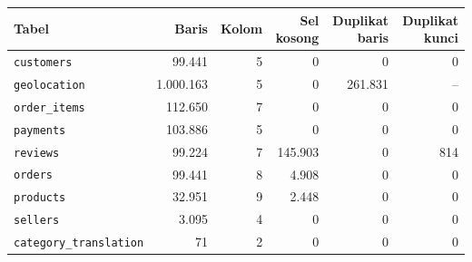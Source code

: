 \begin{tabular}{lrrrrr}
\toprule
Tabel & Baris & Kolom & Sel kosong & Duplikat baris & Duplikat kunci \\
\midrule
\texttt{customers} & 99.441 & 5 & 0 & 0 & 0 \\
\texttt{geolocation} & 1.000.163 & 5 & 0 & 261.831 & -- \\
\texttt{order\_items} & 112.650 & 7 & 0 & 0 & 0 \\
\texttt{payments} & 103.886 & 5 & 0 & 0 & 0 \\
\texttt{reviews} & 99.224 & 7 & 145.903 & 0 & 814 \\
\texttt{orders} & 99.441 & 8 & 4.908 & 0 & 0 \\
\texttt{products} & 32.951 & 9 & 2.448 & 0 & 0 \\
\texttt{sellers} & 3.095 & 4 & 0 & 0 & 0 \\
\texttt{category\_translation} & 71 & 2 & 0 & 0 & 0 \\
\bottomrule
\end{tabular}
